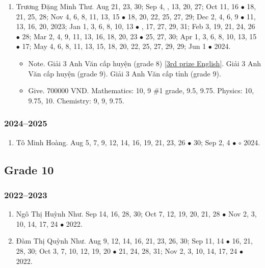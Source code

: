 \documentclass{article}
\begin{document}
\begin{enumerate}
\begin{itemize}
	\end{itemize}
	\item {\sc Trương Đặng Minh Thư.} Aug 21, 23, 30; Sep 4, , 13, 20, 27; Oct 11, 16 $\bullet$ 18, 21, 25, 28; Nov 4, 6, 8, 11, 13, 15 $\bullet$ 18, 20, 22, 25, 27, 29; Dec 2, 4, 6, 9 $\bullet$ 11, 13, 16, 20, 2023; Jan 1, 3, 6, 8, 10, 13 $\bullet$ , 17, 27, 29, 31; Feb 3, 19, 21, 24, 26 $\bullet$ 28; Mar 2, 4, 9, 11, 13, 16, 18, 20, 23 $\bullet$ 25, 27, 30; Apr 1, 3, 6, 8, 10, 13, 15 $\bullet$ 17; May 4, 6, 8, 11, 13, 15, 18, 20, 22, 25, 27, 29, 29; Jun 1 $\bullet$ 2024.
	\begin{itemize}
		\item {\sf Note.} Giải 3 Anh Văn cấp huyện (grade 8) [\href{https://github.com/NQBH/hobby/blob/master/STEM/student/TDMT_3rd_prize_English.jpg}{3rd prize English}]. Giải 3 Anh Văn cấp huyện (grade 9). Giải 3 Anh Văn cấp tỉnh (grade 9).
		\item {\sf Give.} 700000 VND. Mathematics: 10, 9 \#1 grade, 9.5, 9.75. Physics: 10, 9.75, 10. Chemistry: 9, 9, 9.75.
	\end{itemize}
\end{enumerate}

\subsubsection{2024--2025}

\begin{enumerate}
	\item {\sc Tô Minh Hoàng.} {\sf[In]} Aug 5, 7, 9, 12, 14, 16, 19, 21, 23, 26 $\bullet$ 30; Sep 2, 4 $\bullet$ $\circ$ 2024.
\end{enumerate}



\subsection{Grade 10}

\subsubsection{2022--2023}

\begin{enumerate}
	\item {\sc Ngô Thị Huỳnh Như.} {\sf[In]} Sep 14, 16, 28, 30; Oct 7, 12, 19, 20, 21, 28 $\bullet$ Nov 2, 3, 10, 14, 17, 24 $\bullet$ 2022. {\sf[Out]}
	\item {\sc Đàm Thị Quỳnh Như.} {\sf[In]} Aug 9, 12, 14, 16, 21, 23, 26, 30; Sep 11, 14 $\bullet$ 16, 21, 28, 30; Oct 3, 7, 10, 12, 19, 20 $\bullet$ 21, 24, 28, 31; Nov 2, 3, 10, 14, 17, 24 $\bullet$ 2022. {\sf[Out]}
\end{enumerate}
\end{document}
